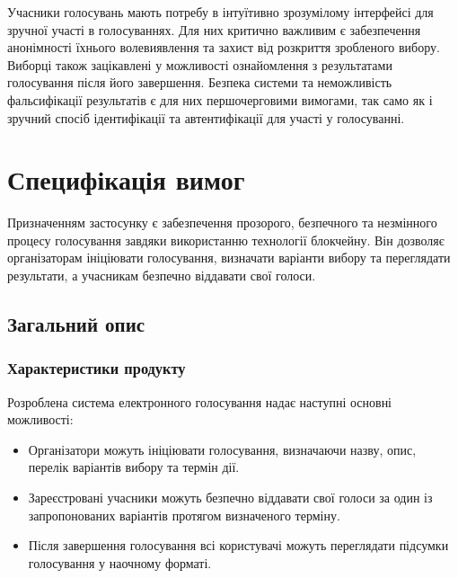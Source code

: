 \documentclass[14pt]{extreport}
\begin{document}
  Учасники голосувань мають потребу в інтуїтивно зрозумілому інтерфейсі для зручної участі в голосуваннях. Для них критично важливим є забезпечення анонімності їхнього волевиявлення та захист від розкриття зробленого вибору. Виборці також зацікавлені у можливості ознайомлення з результатами голосування після його завершення. Безпека системи та неможливість фальсифікації результатів є для них першочерговими вимогами, так само як і зручний спосіб ідентифікації та автентифікації для участі у голосуванні.
  
  \section{Специфікація вимог}
  
  Призначенням застосунку є забезпечення прозорого, безпечного та незмінного процесу голосування завдяки використанню технології блокчейну. Він дозволяє організаторам ініціювати голосування, визначати варіанти вибору та переглядати результати, а учасникам безпечно віддавати свої голоси.
  
  
  \subsection{Загальний опис}
  \subsubsection{Характеристики продукту} 
  
  Розроблена система електронного голосування надає наступні основні можливості:
  
  \begin{itemize}
    \item Організатори можуть ініціювати голосування, визначаючи назву, опис, перелік варіантів вибору та термін дії.
    \item Зареєстровані учасники можуть безпечно віддавати свої голоси за один із запропонованих варіантів протягом визначеного терміну.
    \item Після завершення голосування всі користувачі можуть переглядати підсумки голосування у наочному форматі.
  \end{itemize}
  
\end{document}
